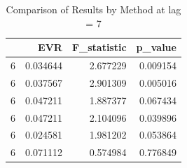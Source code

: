 \begin{table}
\caption{Comparison of Results by Method at lag = 7}
\label{tab:results_by_method}
\begin{tabular}{lrrr}
\toprule
 & EVR & F\_statistic & p\_value \\
\midrule
6 & 0.034644 & 2.677229 & 0.009154 \\
6 & 0.037567 & 2.901309 & 0.005016 \\
6 & 0.047211 & 1.887377 & 0.067434 \\
6 & 0.047211 & 2.104096 & 0.039896 \\
6 & 0.024581 & 1.981202 & 0.053864 \\
6 & 0.071112 & 0.574984 & 0.776849 \\
\bottomrule
\end{tabular}
\end{table}
